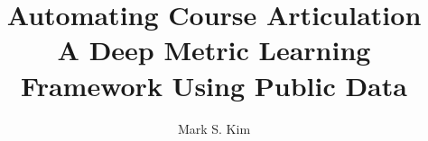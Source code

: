 \documentclass{sfsuthesis}
\begin{document}

\title{Automating Course Articulation\\\vspace*{2mm}\large A Deep Metric Learning Framework Using Public Data}
\makeatletter
\newcommand{\@approvaltitle}{Automating Course Articulation: A Deep Metric Learning Framework Using Public Data}
\makeatother
\author{Mark S. Kim}



\maketitle
\copyrightpage
\approvalpage




\begin{frontmatter}




    

    \tableofcontents
    \clearpage
    \listoftables
    \clearpage
    \listoffigures
    \clearpage

\end{frontmatter}

% 

\pagestyle{headings}








\sloppy
\printbibliography
\fussy

% 
\end{document}
